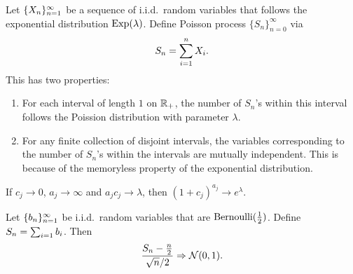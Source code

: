 \documentclass[a4paper]{article}
\newcommand{\convd}{\Rightarrow}
\begin{document}
\begin{eg}
  Let $\{ X_n \}_{n=1}^\infty$ be a sequence of i.i.d.\
  random variables that follows the exponential distribution
  $\operatorname{Exp} (\lambda)$. Define Poisson process $\{S_n\}_{n=0}^\infty$ via
  \[
    S_n = \sum_{i=1}^n X_i.
  \]
  This has
  two properties:
  \begin{enumerate}
    \item For each interval of length $1$ on $\mathbb{R}_+$, the number of
          $S_n$'s within this interval follows the Poission distribution
          with parameter $\lambda$.

    \item For any finite collection of disjoint intervals, the variables
          corresponding to the number of $S_n$'s within the intervals are
          mutually independent. This is because of the memoryless property
          of the exponential distribution.
  \end{enumerate}
\end{eg}

\begin{lemma}
  If $c_j \to 0$, $a_j \to \infty$ and $a_j c_j \to \lambda$,
  then $(1 + c_j)^{a_j} \to e^{\lambda}$.
\end{lemma}

\begin{thm}
  Let $\{ b_n \}_{n=1}^\infty$ be i.i.d.\ random variables that are
  $\operatorname{Bernoulli} (\frac{1}{2})$. Define $S_n = \sum_{i=1} b_i$.
  Then
  \[
    \frac{S_n - \frac{n}{2}}{\sqrt{n} / 2} \convd \ncal (0, 1).
  \]
\end{thm}
\end{document}
